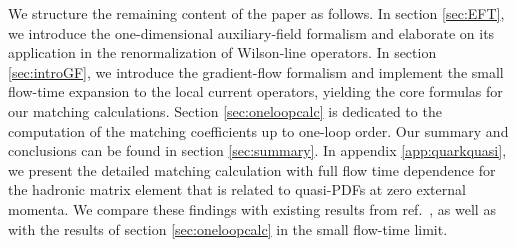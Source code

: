 We structure the remaining content of the paper as follows. In section \ref{sec:EFT}, we introduce the one-dimensional auxiliary-field formalism and elaborate on its application in the renormalization of Wilson-line operators. In section \ref{sec:introGF}, we introduce the gradient-flow formalism and implement the small flow-time expansion to the local current operators, yielding the core formulas for our matching calculations. Section \ref{sec:oneloopcalc} is dedicated to the computation of the matching coefficients up to one-loop order. Our summary and conclusions can be found in section \ref{sec:summary}. In appendix \ref{app:quarkquasi}, we present the detailed matching calculation with full flow time dependence for the hadronic matrix element that is related to quasi-PDFs at zero external momenta. We compare these findings with existing results from ref.~\cite{Monahan:2017hpu}, as well as with the results of section \ref{sec:oneloopcalc} in the small flow-time limit.


